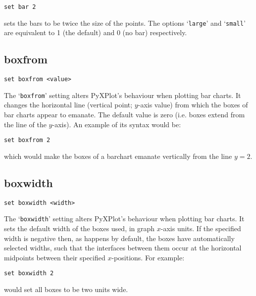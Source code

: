 \documentclass[a4paper,onecolumn,11pt]{book}
\begin{document}
\begin{verbatim}
set bar 2
\end{verbatim}

\noindent sets the bars to be twice the size of the points.  The options `{\tt large}' and
`{\tt small}' are equivalent to 1 (the default) and 0 (no bar) respectively.


\subsection{boxfrom}

\begin{verbatim}
set boxfrom <value>
\end{verbatim}

The `{\tt boxfrom}' setting alters PyXPlot's behaviour when plotting bar charts.
It changes the horizontal line (vertical point; $y$-axis value) from which the
boxes of bar charts appear to emanate.  The default value is zero (i.e. boxes
extend from the line of the $y$-axis). An example of its syntax would be:

\begin{verbatim}
set boxfrom 2
\end{verbatim}

\noindent which would make the boxes of a barchart emanate vertically from the line $y=2$.


\subsection{boxwidth}

\begin{verbatim}
set boxwidth <width>
\end{verbatim}

The `{\tt boxwidth}' setting alters PyXPlot's behaviour when plotting bar charts.
It sets the default width of the boxes used, in graph $x$-axis units.  If the
specified width is negative then, as happens by default, the boxes have
automatically selected widths, such that the interfaces between them occur at
the horizontal midpoints between their specified $x$-positions.  For example:

\begin{verbatim}
set boxwidth 2
\end{verbatim}

\noindent would set all boxes to be two units wide.
\end{document}
